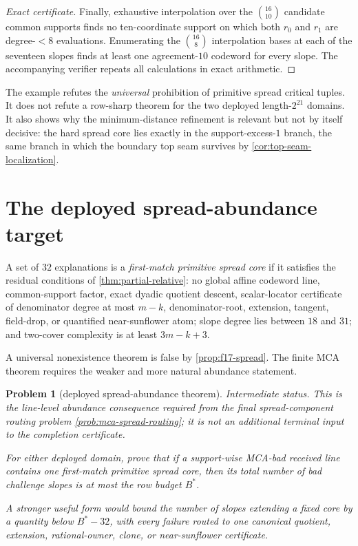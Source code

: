 \documentclass[11pt,a4paper]{amsart}
\numberwithin{equation}{section}
\newtheorem{problem}[theorem]{Problem}
\theoremstyle{remark}
\begin{document}
\begin{proof}[Exact certificate]
Finally, exhaustive interpolation over the $\binom{16}{10}$ candidate common supports finds no ten-coordinate support on which both $r_0$ and $r_1$ are degree-$<8$ evaluations.  Enumerating the $\binom{16}{8}$ interpolation bases at each of the seventeen slopes finds at least one agreement-$10$ codeword for every slope.  The accompanying verifier repeats all calculations in exact arithmetic.
\end{proof}

\begin{remark}\label{rem:counter-scope}
The example refutes the \emph{universal} prohibition of primitive spread critical tuples.  It does not refute a row-sharp theorem for the two deployed length-$2^{21}$ domains.  It also shows why the minimum-distance refinement is relevant but not by itself decisive: the hard spread core lies exactly in the support-excess-$1$ branch, the same branch in which the boundary top seam survives by \cref{cor:top-seam-localization}.
\end{remark}

\section{The deployed spread-abundance target}

\begin{definition}\label{def:spread-core}
A set of $32$ explanations is a \emph{first-match primitive spread core} if it satisfies the residual conditions of \cref{thm:partial-relative}: no global affine codeword line, common-support factor, exact dyadic quotient descent, scalar-locator certificate of denominator degree at most $m-k$, denominator-root, extension, tangent, field-drop, or quantified near-sunflower atom; slope degree lies between $18$ and $31$; and two-cover complexity is at least $3m-k+3$.
\end{definition}

A universal nonexistence theorem is false by \cref{prop:f17-spread}.  The finite MCA theorem requires the weaker and more natural abundance statement.

\begin{problem}[deployed spread-abundance theorem]\label{prob:spread-abundance}
\emph{Intermediate status.}
This is the line-level abundance consequence required from the final
spread-component routing problem \cref{prob:mca-spread-routing}; it is not an
additional terminal input to the completion certificate.

For either deployed domain, prove that if a support-wise MCA-bad received line contains one first-match primitive spread core, then its total number of bad challenge slopes is at most the row budget $B^*$.

A stronger useful form would bound the number of slopes extending a fixed core by a quantity below $B^*-32$, with every failure routed to one canonical quotient, extension, rational-owner, clone, or near-sunflower certificate.
\end{problem}
\end{document}
